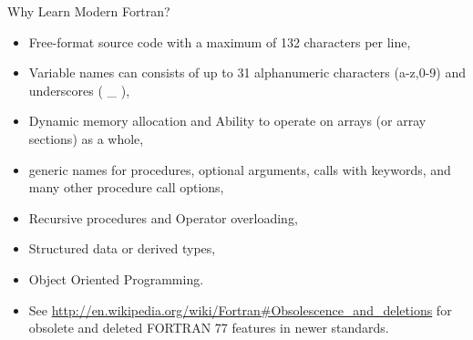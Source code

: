 \documentclass[c,mathserif,compress,xcolor=svgnames]{beamer}
\newenvironment{eblock}[0]
{
\begin{beamerboxesrounded}[upper=uppercol2,lower=lowercol2,shadow=true]}
{\end{beamerboxesrounded}}
\begin{document}
\begin{frame}{Why Learn Modern Fortran?}
  \begin{itemize}
    \item Free-format source code with a maximum of 132 characters per line,
    \item Variable names can consists of up to 31 alphanumeric characters (a-z,0-9) and underscores ( \_ ),
    \item Dynamic memory allocation and Ability to operate on arrays (or array sections) as a whole,
    \item generic names for procedures, optional arguments, calls with keywords, and many other procedure call options,
    \item Recursive procedures and Operator overloading,
    \item Structured data or derived types,
    \item Object Oriented Programming.
    \item See \url{http://en.wikipedia.org/wiki/Fortran\#Obsolescence_and_deletions} for obsolete and deleted FORTRAN 77 features in newer standards.
  \end{itemize}
\end{frame}

\begin{frame}[fragile]{FORTRAN 90 Example}
  \begin{eblock}{SAXPY Code}
    Fortran},basicstyle=\fontsize{6}{5}\selectfont\ttfamily]{./saxpy.f90}
  \end{eblock}
\end{frame}
\end{document}
